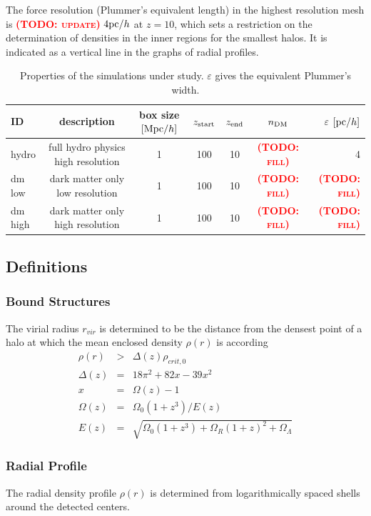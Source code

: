 \documentclass[useAMS,usenatbib]{mn2e}
\newcommand{\TODO}[1]{\textsc{\textbf{\textcolor{red}{(TODO: #1)}}}}
\begin{document}
The force resolution (Plummer's equivalent length) in the highest
resolution mesh is \TODO{update} $4{\rm pc}/h$ at $z=10$, which sets a
restriction on the determination of densities in the inner regions for
the smallest halos. It is indicated as a vertical line in the graphs
of radial profiles.

\begin{table}
  \begin{center} \begin{tabular}{lcccccr} \hline 
      ID & description & box size $[{\rm Mpc}/h]$ & $z_{\rm start}$ & $z_{\rm end}$ & $n_{\rm DM}$ & $\varepsilon$ $[{\rm pc}/h]$\\
      \hline
      hydro   & full hydro physics high resolution & 1 & 100 & 10 & \TODO{fill} & 4\\
      dm low  & dark matter only low resolution    & 1 & 100 & 10 & \TODO{fill} & \TODO{fill}\\
      dm high & dark matter only high resolution   & 1 & 100 & 10 & \TODO{fill} & \TODO{fill}\\
      \hline
    \end{tabular} \end{center}
  \caption{\label{tab:simprop}Properties of the simulations under study. $\varepsilon$ gives the equivalent Plummer's width.}
\end{table}


\subsection{Definitions}
\subsubsection{Bound Structures}
The virial radius $r_{vir}$ is determined to be the distance from the densest point of a halo at which the mean enclosed density $\rho(r)$ is according \cite{Bryan1998}
%
\begin{eqnarray}
  \rho(r)&>&\Delta(z)\rho_{crit,0}\\
  \Delta(z)&=&18\pi^2+82x-39x^2\\
  x&=&\Omega(z)-1\\
  \Omega(z)&=&\Omega_0(1+z^3)/E(z)\\
  E(z)&=&\sqrt{\Omega_0(1+z^3)+\Omega_R(1+z)^2+\Omega_\Lambda}
\end{eqnarray}

\subsubsection{Radial Profile}
The radial density profile $\rho(r)$ is determined from
logarithmically spaced shells around the detected centers.
\end{document}
